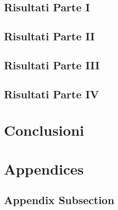 \documentclass{article}
\begin{document}
    \subsection{Risultati Parte I}
    \subsection{Risultati Parte II}
    \subsection{Risultati Parte III}
    \subsection{Risultati Parte IV}
    
    \section{Conclusioni}
    
    
    
    \appendix
    \section*{Appendices}
    \renewcommand{\thesubsection}{\Alph{subsection}}
    
    \subsection{Appendix Subsection}
    
\end{document}
